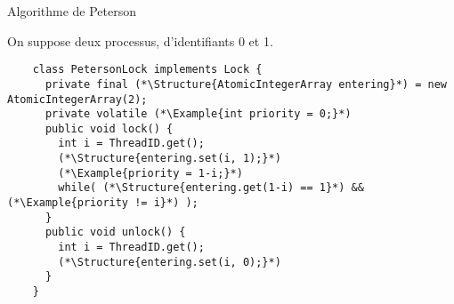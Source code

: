 
\begingroup

\begin{frame}[fragile]{Algorithme de Peterson}

  \vspace{-12.4mm}
  On suppose deux processus, d'identifiants 0 et 1. 

  \begin{lstlisting}
    class PetersonLock implements Lock {
      private final (*\Structure{AtomicIntegerArray entering}*) = new AtomicIntegerArray(2);
      private volatile (*\Example{int priority = 0;}*)
      public void lock() {
        int i = ThreadID.get();
        (*\Structure{entering.set(i, 1);}*)
        (*\Example{priority = 1-i;}*)
        while( (*\Structure{entering.get(1-i) == 1}*) && (*\Example{priority != i}*) );
      }
      public void unlock() {
        int i = ThreadID.get();
        (*\Structure{entering.set(i, 0);}*)
      }
    }
  \end{lstlisting}


  
\end{frame}

\endgroup
\endinput
